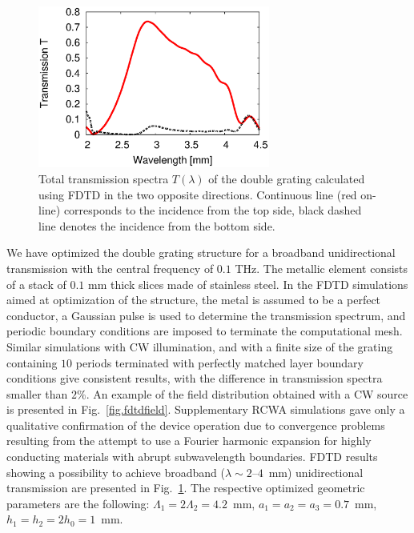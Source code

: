 \documentclass[10pt,letterpaper,twocolumn]{article} %
\begin{document}
\begin{figure}[htb]
 \begin{center}
 \includegraphics[width=3in]{fig3.eps}
\end{center}
\caption{Total transmission spectra $T(\lambda)$ of the double grating calculated using FDTD in the two opposite directions. Continuous line (red on-line) corresponds to the incidence from the top side, black dashed line denotes the incidence from the bottom side.\label{fig.spectra}}
\end{figure} 



We have optimized the double grating structure for a broadband unidirectional transmission with the central frequency of $0.1$ THz. The metallic element consists of a stack of $0.1$ mm thick slices made of stainless steel. In the FDTD simulations aimed at optimization of the structure, the metal is assumed to be a perfect conductor, a Gaussian pulse is used to determine the transmission spectrum, and periodic boundary conditions are imposed to terminate the computational mesh. Similar simulations with CW illumination, and with a finite size of the grating containing $10$ periods terminated with perfectly matched layer boundary conditions give consistent results, with the difference in transmission spectra smaller than $2\%$. An example of the field distribution obtained with a CW source is presented in Fig.~\ref{fig.fdtdfield}. Supplementary RCWA simulations gave only a qualitative confirmation of the device operation due to convergence problems resulting from the attempt to use a Fourier harmonic expansion 
for highly conducting materials with abrupt subwavelength boundaries. FDTD results showing a possibility to achieve 
broadband ($\lambda\sim 2$--$4$~mm) unidirectional transmission are presented in Fig.~\ref{fig.spectra}. The respective optimized geometric parameters are the following: $\Lambda_1=2\Lambda_2=4.2$~mm, $a_1=a_2=a_3=0.7$~mm, $h_1=h_2=2 h_0=1$~mm. 

\end{document}
